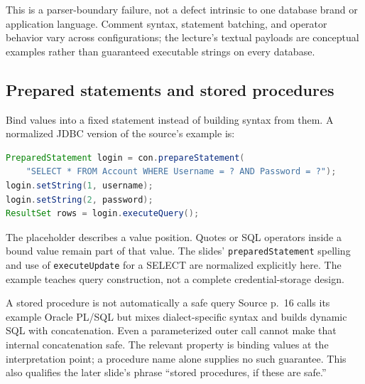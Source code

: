 \documentclass[11pt,a4paper]{article}
\numberwithin{figure}{section}
\begin{document}
This is a parser-boundary failure, not a defect intrinsic to one database brand or application language. Comment syntax, statement batching, and operator behavior vary across configurations; the lecture's textual payloads are conceptual examples rather than guaranteed executable strings on every database.

\begin{center}\end{center}

\subsection{Prepared statements and stored procedures}
Bind values into a fixed statement instead of building syntax from them. A normalized JDBC version of the source's example is:
\begin{lstlisting}[language=Java]
PreparedStatement login = con.prepareStatement(
    "SELECT * FROM Account WHERE Username = ? AND Password = ?");
login.setString(1, username);
login.setString(2, password);
ResultSet rows = login.executeQuery();
\end{lstlisting}
The placeholder describes a value position. Quotes or SQL operators inside a bound value remain part of that value. The slides' \texttt{preparedStatement} spelling and use of \texttt{executeUpdate} for a SELECT are normalized explicitly here. The example teaches query construction, not a complete credential-storage design.

\begin{correction}{A stored procedure is not automatically a safe query}
Source p.~16 calls its example Oracle PL/SQL but mixes dialect-specific syntax and builds dynamic SQL with concatenation. Even a parameterized outer call cannot make that internal concatenation safe. The relevant property is binding values at the interpretation point; a procedure name alone supplies no such guarantee. This also qualifies the later slide's phrase ``stored procedures, if these are safe.''
\end{correction}
\end{document}
